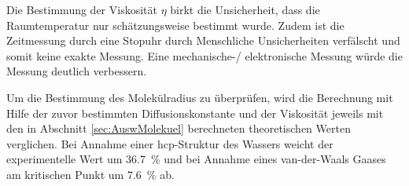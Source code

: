 Die Bestimmung der Viskosität $\eta$ birkt die Unsicherheit, dass die Raumtemperatur
nur schätzungsweise bestimmt wurde. Zudem ist die Zeitmessung durch eine Stopuhr durch
Menschliche Unsicherheiten verfälscht und somit keine exakte Messung. Eine mechanische-/
elektronische Messung würde die Messung deutlich verbessern.

Um die Bestimmung des Molekülradius zu überprüfen, wird die Berechnung mit Hilfe der zuvor
bestimmten Diffusionskonstante und der Viskosität jeweils mit den
in Abschnitt \ref{sec:AuswMolekuel} berechneten theoretischen Werten verglichen.
Bei Annahme einer hcp-Struktur des Wassers weicht der experimentelle Wert
um \SI{36.7}{\percent} und bei Annahme eines
van-der-Waals Gaases am kritischen Punkt um \SI{7.6}{\percent} ab.
